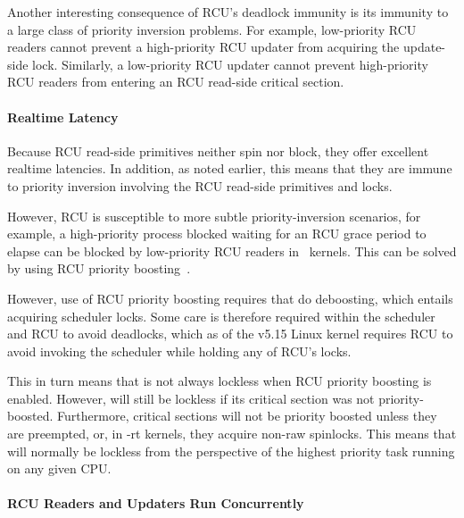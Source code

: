 Another interesting consequence of RCU's deadlock immunity is its
immunity to a large class of priority inversion problems.
For example, low-priority RCU readers cannot prevent a high-priority
RCU updater from acquiring the update-side lock.
Similarly, a low-priority RCU updater cannot prevent high-priority
RCU readers from entering an RCU read-side critical section.

\QuickQuizEnd

\paragraph{Realtime Latency}

Because RCU read-side primitives neither spin nor block, they offer
excellent realtime latencies.
In addition, as noted earlier, this means that they are
immune to priority inversion
involving the RCU read-side primitives and locks.

However, RCU is susceptible to more subtle priority-inversion scenarios,
for example, a high-priority process blocked waiting for an RCU
grace period to elapse can be blocked by low-priority RCU readers
in \rt\ kernels.
This can be solved by using RCU priority
boosting~\cite{PaulEMcKenney2007BoostRCU,DinakarGuniguntala2008IBMSysJ}.

However, use of RCU priority boosting requires that 
do deboosting, which entails acquiring scheduler locks.
Some care is therefore required within the scheduler and RCU to avoid
deadlocks, which as of the v5.15 Linux kernel requires RCU to avoid
invoking the scheduler while holding any of RCU's locks.

This in turn means that  is not always lockless
when RCU priority boosting is enabled.
However,  will still be lockless if its
critical section was not priority-boosted.
Furthermore, critical sections will not be priority boosted unless they
are preempted, or, in -rt kernels, they acquire non-raw spinlocks.
This means that  will normally be lockless from the
perspective of the highest priority task running on any given CPU.

\paragraph{RCU Readers and Updaters Run Concurrently}

